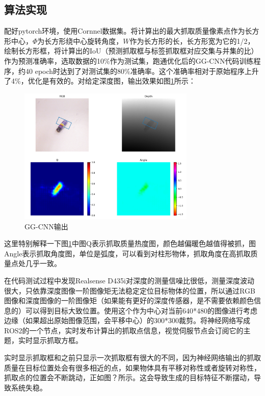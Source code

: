 \documentclass[fontset=fandol,type=bachelor,campus=harbin]{hithesisbook}
\begin{document}
\subsection{算法实现}
配好pytorch环境，使用Cornnel数据集。将计算出的最大抓取质量像素点作为长方形中心，$\varPhi$为长方形绕中心旋转角度，$W$作为长方形的长，长方形宽为它的1/2，绘制长方形框，将计算出的IoU（预测抓取框与标签抓取框对应交集与并集的比）作为预测准确率，选取数据的10\%作为测试集，跑通优化后的GG-CNN代码训练程序，约40 epoch时达到了对测试集的80\%准确率。这个准确率相对于原始程序上升了4\%，优化是有效的。对给定深度图，输出效果如图\ref{GG-CNN输出（初始）}所示：
\begin{figure}[h]
\centering
\includegraphics[width = 0.75\textwidth]{chapter3/GG-CNN输出（初始）}
\caption{GG-CNN输出}
\label{GG-CNN输出（初始）}
\end{figure}


这里特别解释一下图\ref{GG-CNN输出（初始）}中图Q表示抓取质量热度图，颜色越偏暖色越值得被抓，图Angle表示抓取角度图，单位是弧度，可以看到对柱形物体，抓取角度在高抓取质量点处几乎一致。


在代码测试过程中发现Realsense D435i对深度的测量信噪比很低，测量深度波动很大，只依靠深度图像一阶图像矩无法稳定定位目标物体的位置，所以通过RGB图像和深度图像的一阶图像矩（如果能有更好的深度传感器，是不需要依赖颜色信息的）可以得到目标大致位置。使用这个作为中心对当前640*480的图像进行考虑边缘（如果超出原始图像范围，会平移中心）的300*300裁剪。将神经网络写成ROS2的一个节点，实时发布计算出的抓取点信息，视觉伺服节点会订阅它的主题，实时显示抓取方框。


实时显示抓取框和之前只显示一次抓取框有很大的不同，因为神经网络输出的抓取质量在目标位置处会有很多相近的点，如果物体具有平移对称性或者旋转对称性，抓取点的位置会不断跳动，正如{\color{red}图？所示。}这会导致生成的目标特征不断摆动，导致系统失稳。
\end{document}

